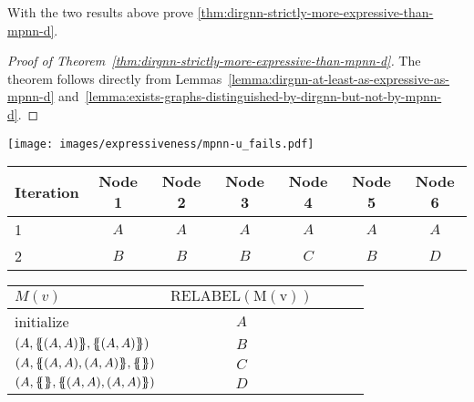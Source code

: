 \documentclass{article}
\newcommand\oursacro{Dir-GNN}
\newcommand*{\ldblbrace}{\{\mskip-6mu\{}
\newcommand*{\rdblbrace}{\}\mskip-6mu\}}
\theoremstyle{plain}
\theoremstyle{definition}
\theoremstyle{remark}
\begin{document}
 
With the two results above prove \cref{thm:dirgnn-strictly-more-expressive-than-mpnn-d}.

\begin{proof}[Proof of Theorem~\ref{thm:dirgnn-strictly-more-expressive-than-mpnn-d}]
    The theorem follows directly from Lemmas~\ref{lemma:dirgnn-at-least-as-expressive-as-mpnn-d} and~\ref{lemma:exists-graphs-distinguished-by-dirgnn-but-not-by-mpnn-d}.
\end{proof}

\begin{figure*}
    \centering
    \texttt{[image: images/expressiveness/mpnn-u\_fails.pdf]}
    \caption{Two non-isomorphic directed graphs that cannot be distinguished by any MPNN-U model but can be distinguished by \oursacro{}.}
    \label{fig:mpnn-u_fails}
\end{figure*}

\begin{table*}[t]
\vskip 0.15in
\begin{center}
\begin{small}
\begin{sc}
\begin{tabular}{l||ccc|ccc}
\toprule
Iteration     & Node 1  & Node 2 & Node 3 & Node 4 & Node 5  & Node 6 \\
\midrule
1             &  $A$      &  $A$     &  $A$     &  $A$     &  $A$      &  $A$     \\
2             &  $B$      &  $B$     &  $B$     &  $C$     &  $B$      &  $D$     \\
\bottomrule
\end{tabular}

\begin{tabular}{lcccr}
\toprule
$M(v)$                                               & $\mathrm{RELABEL(M(v))}$   \\
\midrule
initialize                                           &   $A$                        \\
$(A, \ldblbrace (A, A) \rdblbrace, \ldblbrace (A, A) \rdblbrace)$              &   $B$                        \\
$(A, \ldblbrace (A, A), (A, A) \rdblbrace, \ldblbrace \rdblbrace)$             &   $C$                        \\
$(A, \ldblbrace  \rdblbrace, \ldblbrace (A, A), (A, A)\rdblbrace)$             &   $D$                        \\
\bottomrule
\end{tabular}

\end{sc}
\end{small}
\end{center}
\caption{Node colorings at different iterations, , as well as the $\mathrm{RELABEL}$ hash function, when applying D-WL to the two graphs in~\cref{fig:mpnn-u_fails}.}
\label{tab:wl-d-2}
\end{table*}
\end{document}
